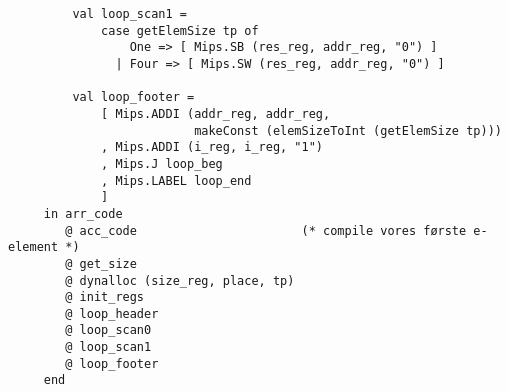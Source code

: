\documentclass{article}
\begin{document}
\begin{verbatim}
         val loop_scan1 =
             case getElemSize tp of
                 One => [ Mips.SB (res_reg, addr_reg, "0") ]
               | Four => [ Mips.SW (res_reg, addr_reg, "0") ]

         val loop_footer =
             [ Mips.ADDI (addr_reg, addr_reg,
                          makeConst (elemSizeToInt (getElemSize tp)))
             , Mips.ADDI (i_reg, i_reg, "1")
             , Mips.J loop_beg
             , Mips.LABEL loop_end
             ]
     in arr_code
        @ acc_code                       (* compile vores første e-element *)
        @ get_size
        @ dynalloc (size_reg, place, tp)
        @ init_regs
        @ loop_header
        @ loop_scan0
        @ loop_scan1
        @ loop_footer
     end	
\end{verbatim}
\end{document}
